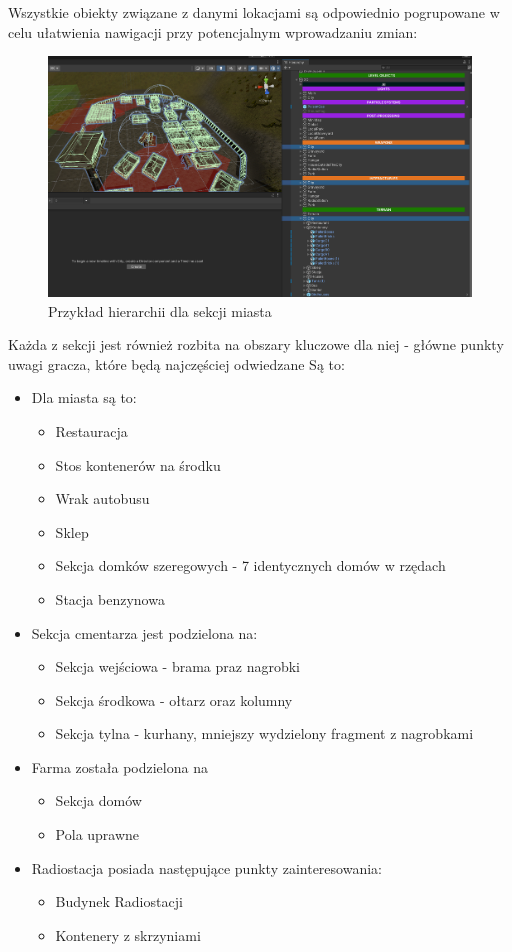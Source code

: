 Wszystkie obiekty związane z danymi lokacjami są odpowiednio pogrupowane w celu ułatwienia nawigacji przy potencjalnym wprowadzaniu zmian:
\begin{figure}[h]
    \centering
    \includegraphics[width=1\linewidth]{Images/cityexamplehierarchy.png}
    \caption{Przykład hierarchii dla sekcji miasta}
\end{figure}
Każda z sekcji jest również rozbita na obszary kluczowe dla niej - główne punkty uwagi gracza, które będą najczęściej odwiedzane
Są to:
\begin{itemize}
    \item Dla miasta są to:
    \begin{itemize}
        \item Restauracja
        \item Stos kontenerów na środku
        \item Wrak autobusu
        \item Sklep
        \item Sekcja domków szeregowych - 7 identycznych domów w rzędach
        \item Stacja benzynowa
    \end{itemize}
    \item Sekcja cmentarza jest podzielona na:
    \begin{itemize}
        \item Sekcja wejściowa - brama praz nagrobki
        \item Sekcja środkowa - ołtarz oraz kolumny
        \item Sekcja tylna - kurhany, mniejszy wydzielony fragment z nagrobkami
    \end{itemize}
    \item Farma została podzielona na
    \begin{itemize}
        \item Sekcja domów
        \item Pola uprawne
    \end{itemize}
    \item Radiostacja posiada następujące punkty zainteresowania:
    \begin{itemize}
        \item Budynek Radiostacji
        \item Kontenery z skrzyniami
    \end{itemize}
\end{itemize}

